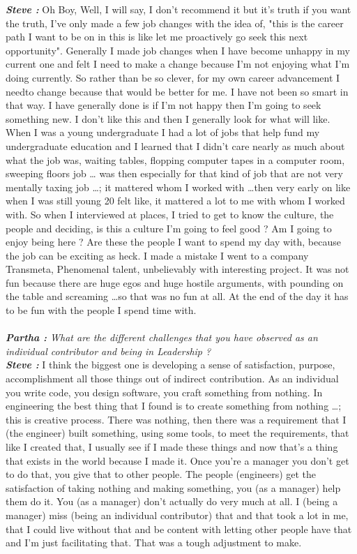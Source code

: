 \documentclass[a4paper, 12pt]{article}
\begin{document}
\begin{flushleft}
 	\textbf {\textit {Steve :}} Oh Boy, Well, I will say, I don't recommend it but it's truth if you want the truth, I've only made a few job changes with the idea of, "this is the career path I want to be on in this is like let me proactively go seek this next opportunity". Generally I made job changes when I have become unhappy in my current one and felt I need to make a change because I'm not enjoying what I'm doing currently. So rather than be so clever, for my own career advancement I needto change because that would be better for me. I have not been so smart in that way. I have generally done is if I'm not happy then I'm going to seek something new. I don't like this and then I generally look for what will like. When I was a young undergraduate I had a lot of jobs that help fund my undergraduate education and I learned that I didn't care nearly as much about what the job was, waiting tables, flopping computer tapes in a computer room, sweeping floors job … was then especially for that kind of job that are not very mentally taxing job \ldots; it mattered whom I worked with \ldots then very early on like when I was still young 20 felt like, it mattered a lot to me with whom I worked with. So when I interviewed at places, I tried to get to know the culture, the people and deciding, is this a culture I'm going to feel good ? Am I going to enjoy being here ? Are these the people I want to spend my day with, because the job can be exciting as heck. I made a mistake I went to a company Transmeta, Phenomenal talent, unbelievably with interesting project. It was not fun because there are huge egos and huge hostile arguments, with pounding on the table and screaming \ldots so that was no fun at all.  At the end of the day it has to be fun with the people I spend time with.\\~\\
	\textit {\textbf{Partha :} What are the different challenges that you have observed as an individual contributor and being in Leadership ?} \\ 
        \textbf {\textit {Steve :}} I think the biggest one is developing a sense of satisfaction, purpose, accomplishment all those things out of indirect contribution. As an individual you write code, you design software, you craft something from nothing. In engineering the best thing that I found is to create something from nothing \ldots; this is creative process. There was nothing, then there was a requirement that I (the engineer) built something, using some tools, to meet the requirements, that like I created that, I usually see if I made these things and now that's a thing that exists in the world because I made it. Once you're a manager you don't get to do that, you give that to other people. The people (engineers) get the satisfaction of taking nothing and making something, you (as a manager) help them do it. You (as a manager) don't actually do very much at all. I (being a manager) miss (being an individual contributor) that and that took a lot in me, that I could live without that and be content with letting other people have that and I'm just facilitating that. That was a tough adjustment to make.

\end{flushleft}
\end{document}
